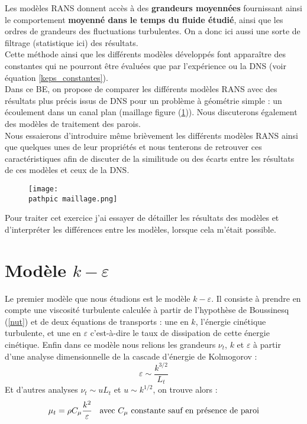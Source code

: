 \documentclass[a4paper,10pt]{article}
\newcommand\pathpic{/home/saura/Documents/Latex_files/Pic/}
\newcommand{\cad}{c'est-à-dire }
\newcommand{\keps}{$k-\varepsilon$}
\newcommand{\brik}{\color{brick}}
\newcommand\black{\color{black}}
\begin{document}
\noindent Les modèles RANS donnent accès à des \textbf{grandeurs moyennées} fournissant ainsi le comportement \textbf{moyenné dans le temps du fluide étudié}, ainsi que les ordres de grandeurs des fluctuations turbulentes. On a donc ici aussi une sorte de filtrage (statistique ici) des résultats.\\
Cette méthode ainsi que les différents modèles développés font apparaître des constantes qui ne pourront être évaluées que par l'expérience ou la DNS (voir équation \ref{keps_constantes}).\\
 Dans ce BE, on propose de comparer les différents modèles RANS avec des résultats plus précis issus de DNS pour un problème à géométrie simple : un écoulement dans un canal plan (maillage figure (\ref{maillage})). Nous discuterons également des modèles de traitement des parois.\\
 Nous essaierons d'introduire même brièvement les différents modèles RANS ainsi que quelques unes de leur propriétés et nous tenterons de retrouver ces caractéristiques afin de discuter de la similitude ou des écarts entre les résultats de ces modèles et ceux de la DNS.

\begin{figure} [ht!]
\centering
\texttt{[image: \\pathpic maillage.png]}
\caption{}
\label{maillage}
\end{figure}

\vspace{2cm}
Pour traiter cet exercice j'ai essayer de détailler les résultats des modèles et d'interpréter les différences entre les modèles, lorsque cela m'était possible.
\pagebreak
 
 \brik
  \section{Modèle $k-\varepsilon$} \black

Le premier modèle que nous étudions est le modèle \keps . Il consiste à prendre en compte une viscosité turbulente calculée à partir de l'hypothèse de Boussinesq (\ref{nut}) et de deux équations de transports : une en $k$, l'énergie cinétique turbulente, et une en $\varepsilon$ \cad le taux de dissipation de cette énergie cinétique. Enfin dans ce modèle nous relions les	 grandeurs $\nu_t$, $k$ et $\varepsilon$ à partir d'une analyse dimensionnelle de la cascade d'énergie de Kolmogorov :
\begin{equation}
\varepsilon \sim \frac{k^{3/2}}{L_t} \label{kolmo}
\end{equation} 
Et d'autres analyses $\nu_t \sim uL_t$ et $u \sim k^{1/2}$, on trouve alors :  
\begin{equation}
 \mu_t = \rho C_\mu \frac{k^2}{\varepsilon} \text{\hspace{2 mm} avec $C_\mu$ constante sauf en présence de paroi}\label{mut}
\end{equation}
\end{document}
